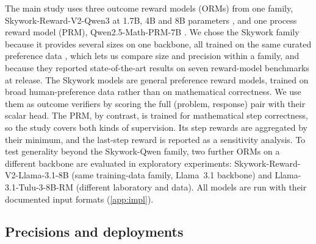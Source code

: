 The main study uses three outcome reward models (ORMs) from one family,
Skywork-Reward-V2-Qwen3 at 1.7B, 4B and 8B parameters \cite{skywork2025v2}, and one
process reward model (PRM), Qwen2.5-Math-PRM-7B \cite{zhang2025prm}. We chose the Skywork family because it provides several sizes on one backbone, all
trained on the same curated preference data \cite{skywork2025v2}, which lets us compare
size and precision within a family, and because they reported state-of-the-art results on seven reward-model benchmarks at
release. The Skywork models are
general preference reward models, trained on broad human-preference data rather than
on mathematical correctness. We use them as outcome verifiers by scoring the full
(problem, response) pair with their scalar head. The PRM, by contrast, is trained for
mathematical step correctness, so the study covers both kinds of supervision. Its step
rewards are aggregated by their minimum, and the last-step reward is reported as a
sensitivity analysis. To test generality beyond the Skywork-Qwen family, two further
ORMs on a different backbone are evaluated in exploratory experiments:
Skywork-Reward-V2-Llama-3.1-8B (same training-data family, Llama~3.1 backbone) and
Llama-3.1-Tulu-3-8B-RM \cite{lambert2024tulu3} (different laboratory and data). All
models are run with their documented input formats (\ref{app:impl}).

\subsection{Precisions and deployments}\label{sec:precisions}

